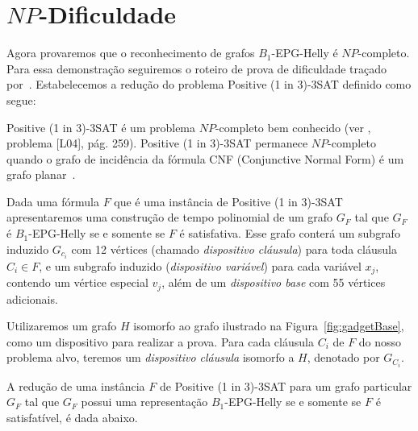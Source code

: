\section{$NP$-Dificuldade}\label{sec:sectionDispositivoClausula}

Agora provaremos que o reconhecimento de grafos   $B_1$-EPG-Helly é $NP$-completo. Para essa demonstração seguiremos o roteiro de prova de dificuldade traçado por~\cite{heldt2014}.  Estabelecemos a redução do problema {\sc Positive (1 in 3)-3SAT} definido como segue:



{\sc Positive (1 in 3)-3SAT } é um problema $NP$-completo bem conhecido (ver \cite{johnson1979}, problema [L04], pág. 259). {\sc Positive (1 in 3)-3SAT} permanece $NP$-completo quando o grafo de incidência da fórmula CNF (Conjunctive Normal Form) é um grafo planar~\cite{mulzer2008minimum}.

Dada uma fórmula  $F$ que é uma instância de {\sc Positive (1 in 3)-3SAT} apresentaremos uma construção de tempo polinomial de um grafo $ G_F$ tal que  $ G_F $ é $ B_1$-EPG-Helly se e somente se $ F $ é satisfativa. Esse grafo conterá um subgrafo induzido  $ G_{c_i}$ com 12 vértices (chamado \emph {dispositivo cláusula}) para toda cláusula $C_i \in F$, e um subgrafo induzido (\emph {dispositivo variável}) para cada variável $ x_j$, contendo um vértice especial   $ v_j$, além de um  \emph{dispositivo base}  com 55 vértices adicionais.

Utilizaremos um grafo $H$ isomorfo ao grafo ilustrado na Figura~\ref{fig:gadgetBase}, como um  dispositivo para realizar a prova. Para cada cláusula  $C_i$ de $F$ do nosso problema alvo, teremos um \emph{dispositivo cláusula} isomorfo a $H$, denotado por $G_{C_i}$. %

 


A redução  de uma instância $F$ de  {\sc Positive (1 in 3)-3SAT}  para um grafo particular $G_F$ tal que $G_F$ possui uma representação $B_{1}$-EPG-Helly se e somente se $F$ é satisfatível, é dada abaixo.

